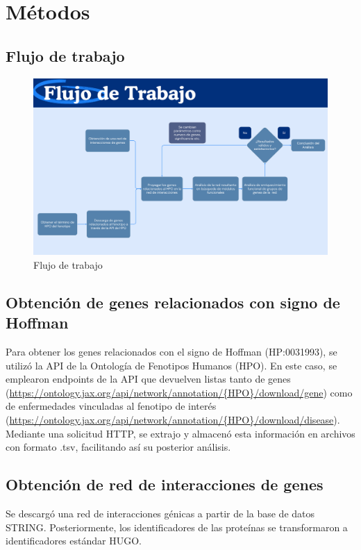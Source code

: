 \section{Métodos}

\subsection{Flujo de trabajo}

\begin{figure}[h!]
	\includegraphics[width=.95\textwidth]{figures/workflow.png}
	\caption{Flujo de trabajo}
	\label{fig:workflow}
\end{figure}

\subsection{Obtención de genes relacionados con signo de Hoffman}

Para obtener los genes relacionados con el signo de Hoffman (HP:0031993), se utilizó la API de la Ontología de Fenotipos Humanos (HPO). En este caso, se emplearon endpoints de la API que devuelven listas tanto de genes (\url{https://ontology.jax.org/api/network/annotation/{HPO}/download/gene}) como de enfermedades vinculadas al fenotipo de interés (\url{https://ontology.jax.org/api/network/annotation/{HPO}/download/disease}). Mediante una solicitud HTTP, se extrajo y almacenó esta información en archivos con formato .tsv, facilitando así su posterior análisis. 


\subsection{Obtención de red de interacciones de genes}

Se descargó una red de interacciones génicas a partir de la base de datos STRING. Posteriormente, los identificadores de las proteínas se transformaron a identificadores estándar HUGO.

